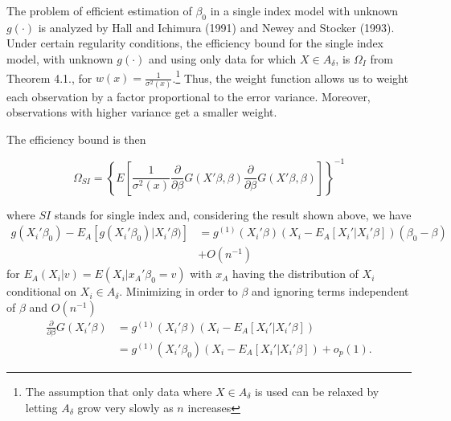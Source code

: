 \documentclass[a4paper]{article}
\begin{document}




The problem of efficient estimation of $\beta_0$ in a single index model with unknown $g(\cdot)$ is analyzed by Hall and Ichimura (1991) and Newey and Stocker (1993). Under certain regularity conditions, the efficiency bound for the single index model, with unknown $g(\cdot)$ and using only data for which $X \in A_{\delta}$, is $\Omega_I$ from Theorem 4.1., for $w(x) = \frac{1}{\sigma^2(x)}$.\footnote{The assumption that only data where  $X \in A_{\delta}$ is used can be relaxed by letting $A_\delta$ grow very slowly as $n$ increases} Thus, the weight function allows us to weight each observation by a factor proportional to the error variance. Moreover, observations with higher variance get a smaller weight. 

The efficiency bound is then

\begin{equation}
\Omega_{SI} = \left\{ E\left[\frac{1}{\sigma^2(x)}\frac{\partial}{\partial \beta}
 G(X'\beta,\beta)\frac{\partial}{\partial \beta} G(X'\beta,\beta) \right] \right\}^{-1}
\end{equation}

where $SI$ stands for single index and, considering the result shown above, we have
\begin{align*}
g(X_i'\beta_0) - E_A[g(X_i'\beta_0)|X_i'\beta)] & = g^{(1)}(X_i'\beta)( X_i - E_A[X_i'|X_i'\beta])(\beta_0 - \beta) \\
											   & + O(n^{-1})
\end{align*}
for $E_A(X_i|v) = E(X_i|x_A'\beta_0 = v)$ with $x_A$ having the distribution of $X_i$ conditional on $X_i \in A_\delta$. Minimizing in order to $\beta$ and ignoring terms independent of $\beta$ and $O(n^{-1})$
\begin{align*}
 \frac{\partial}{\partial \beta} G(X_i'\beta) & = g^{(1)}(X_i'\beta)( X_i - E_A[X_i'|X_i'\beta]) \\
 										   & = g^{(1)}(X_i'\beta_0)( X_i - E_A[X_i'|X_i'\beta]) + o_p(1).
\end{align*}
\end{document}
